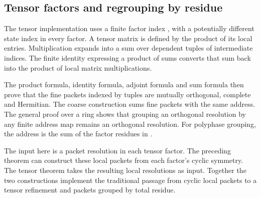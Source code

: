 \subsection{Tensor factors and regrouping by residue}
The tensor implementation uses a finite factor index , with a potentially different state index  in every factor. A tensor matrix is defined by the product of its local entries. Multiplication expands into a sum over dependent tuples of intermediate indices. The finite identity expressing a product of sums converts that sum back into the product of local matrix multiplications.


The product formula, identity formula, adjoint formula and sum formula then prove that the fine packets indexed by tuples are mutually orthogonal, complete and Hermitian. The coarse construction sums fine packets with the same address. The general proof over a ring shows that grouping an orthogonal resolution by any finite address map remains an orthogonal resolution. For polyphase grouping, the address is the sum of the factor residues in .



The input here is a packet resolution in each tensor factor. The preceding theorem can construct these local packets from each factor's cyclic symmetry. The tensor theorem takes the resulting local resolutions as input. Together the two constructions implement the traditional passage from cyclic local packets to a tensor refinement and packets grouped by total residue.
